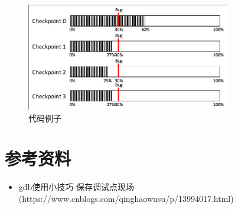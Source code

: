 \documentclass[UTF8]{article}   %
\begin{document}
\begin{figure}[H]
\begin{center}
    \includegraphics[width=0.8\textwidth]{./pic/RunAndCopyCheckpoint}
\end{center}
\caption{代码例子}
\label{fig:main}
\end{figure}

\section{参考资料}
\begin{itemize}
    \item gdb使用小技巧-保存调试点现场 (https://www.cnblogs.com/qinghaowusu/p/13994017.html)
\end{itemize}
\end{document}
